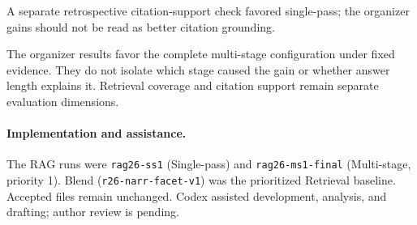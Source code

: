 \documentclass[11pt,letterpaper]{article}
\newcommand{\run}[1]{\texttt{#1}}
\begin{document}
A separate retrospective citation-support check favored single-pass; the organizer gains should not be read as better citation grounding.

The organizer results favor the complete multi-stage configuration under fixed evidence. They do not isolate which stage caused the gain or whether answer length explains it. Retrieval coverage and citation support remain separate evaluation dimensions.

{\small\paragraph{Implementation and assistance.} The RAG runs were \run{rag26-ss1} (Single-pass) and \run{rag26-ms1-final} (Multi-stage, priority 1). Blend (\run{r26-narr-facet-v1}) was the prioritized Retrieval baseline. Accepted files remain unchanged. Codex assisted development, analysis, and drafting; author review is pending.}
\end{document}
